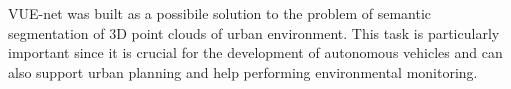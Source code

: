 VUE-net was built as a possibile solution to the problem of semantic segmentation of 
3D point clouds of urban environment.
This task is particularly important since it is crucial for the development of autonomous 
vehicles and can also support urban planning and help performing environmental monitoring.
